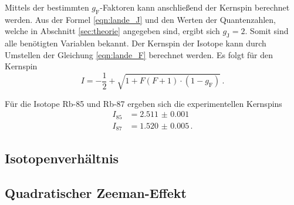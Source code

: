 Mittels der bestimmten $g_{\text{F}}$-Faktoren kann anschließend der Kernspin berechnet werden.
Aus der Formel \ref{eqn:lande_J} und den Werten der Quantenzahlen, welche in Abschnitt \ref{sec:theorie} angegeben sind,
ergibt sich $g_{\text{J}} = 2$.
Somit sind alle benötigten Variablen bekannt.
Der Kernspin der Isotope kann durch Umstellen der Gleichung \ref{eqn:lande_F} berechnet werden.
Es folgt für den Kernspin
\begin{equation}
    I = -\frac{1}{2} + \sqrt{1 + F(F+1) \cdot (1 - g_{\text{F}})} \, .
\end{equation}

Für die Isotope Rb-85 und Rb-87 ergeben sich die experimentellen Kernspins
\begin{align}
    I_{85} &= \qty{2.511(1)} \\
    I_{87} &= \qty{1.520(5)} \, .
\end{align}

\subsection{Isotopenverhältnis}
\label{sec:Isotopenverhältnis}

\subsection{Quadratischer Zeeman-Effekt}
\label{sec:quadratischer-zeeman-effekt}